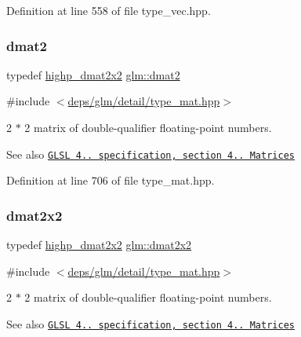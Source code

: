 Definition at line 558 of file type\+\_\+vec.\+hpp.

\mbox{\label{group__core__types_gad8c130d26c4cd9a1a831c1a74292a8f6}} 
\subsubsection{\texorpdfstring{dmat2}{dmat2}}
{\footnotesize\ttfamily typedef \hyperlink{group__core__precision_gad08aec6bf6b5ae7d486fbabb3b28f904}{highp\+\_\+dmat2x2} \hyperlink{group__core__types_gad8c130d26c4cd9a1a831c1a74292a8f6}{glm\+::dmat2}}



{\ttfamily \#include $<$\hyperlink{type__mat_8hpp}{deps/glm/detail/type\+\_\+mat.\+hpp}$>$}

2 $\ast$ 2 matrix of double-\/qualifier floating-\/point numbers.

\begin{DoxySeeAlso}{See also}
\href{http://www.opengl.org/registry/doc/GLSLangSpec.4.20.8.pdf}{\tt G\+L\+SL 4.. specification, section 4.. Matrices} 
\end{DoxySeeAlso}


Definition at line 706 of file type\+\_\+mat.\+hpp.

\mbox{\label{group__core__types_gae9932771e11a4f38e21f1136423bab18}} 
\subsubsection{\texorpdfstring{dmat2x2}{dmat2x2}}
{\footnotesize\ttfamily typedef \hyperlink{group__core__precision_gad08aec6bf6b5ae7d486fbabb3b28f904}{highp\+\_\+dmat2x2} \hyperlink{group__core__types_gae9932771e11a4f38e21f1136423bab18}{glm\+::dmat2x2}}



{\ttfamily \#include $<$\hyperlink{type__mat_8hpp}{deps/glm/detail/type\+\_\+mat.\+hpp}$>$}

2 $\ast$ 2 matrix of double-\/qualifier floating-\/point numbers.

\begin{DoxySeeAlso}{See also}
\href{http://www.opengl.org/registry/doc/GLSLangSpec.4.20.8.pdf}{\tt G\+L\+SL 4.. specification, section 4.. Matrices} 
\end{DoxySeeAlso}



